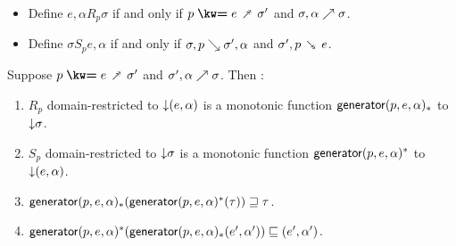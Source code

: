 \begin{lemma}
  \label{lem:aux:totalise:gc}
  \item
  \begin{itemize}
    \item Define $e, \alpha \mathrel{R_p} \sigma $ if and only if $\clauseUncurried{p}{e} \dfwdarrow \sigma'$ and ${\sigma},{\alpha} \nearrow {\sigma}$.
    \item Define $\sigma \mathrel{S_p} e, \alpha$ if and only if ${\sigma}, {p} \searrow {\sigma'}, {\alpha}$ and $\sigma', p \dbwdarrow e$. 
  \end{itemize}
  Suppose $\clauseUncurried{p}{e} \dfwdarrow \sigma'$ and ${\sigma'},{\alpha} \nearrow {\sigma}$. Then :
  \begin{enumerate}
     \item $\mathrel{R_p}$ domain-restricted to ${\downarrow}{(e, \alpha)}$ is a monotonic function $\mathsf{generator}(p, e, \alpha)_*$ to ${\downarrow}{\sigma}$.
     \item $\mathrel{S_p}$ domain-restricted to ${\downarrow}{\sigma}$ is a monotonic function $\mathsf{generator}(p, e, \alpha)^*$ to ${\downarrow}{(e, \alpha)}$.
     \item $\mathsf{generator}(p, e, \alpha)_*(\mathsf{generator}(p, e, \alpha)^*(\tau)) \sqsupseteq \tau$.
     \item $\mathsf{generator}(p, e, \alpha)^*(\mathsf{generator}(p, e, \alpha)_*(e', \alpha')) \sqsubseteq (e', \alpha')$.
  \end{enumerate}
\end{lemma}
